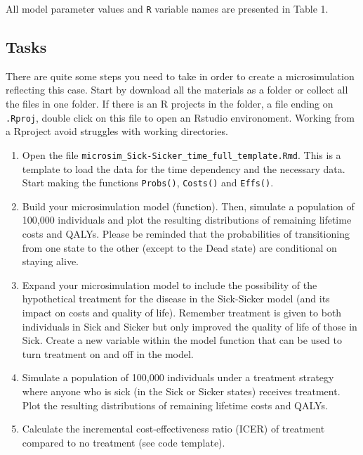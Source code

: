 \documentclass[
]{article}
\begin{document}
All model parameter values and \texttt{R} variable names are presented
in Table 1.

\hypertarget{tasks}{%
\subsection{Tasks}\label{tasks}}

There are quite some steps you need to take in order to create a
microsimulation reflecting this case. Start by download all the
materials as a folder or collect all the files in one folder. If there
is an R projects in the folder, a file ending on \texttt{.Rproj}, double
click on this file to open an Rstudio environoment. Working from a
Rproject avoid struggles with working directories.

\begin{enumerate}
\def\labelenumi{\arabic{enumi}.}
\item
  Open the file
  \texttt{microsim\_Sick-Sicker\_time\_full\_template.Rmd}. This is a
  template to load the data for the time dependency and the necessary
  data. Start making the functions \texttt{Probs()}, \texttt{Costs()}
  and \texttt{Effs()}.
\item
  Build your microsimulation model (function). Then, simulate a
  population of 100,000 individuals and plot the resulting distributions
  of remaining lifetime costs and QALYs. Please be reminded that the
  probabilities of transitioning from one state to the other (except to
  the Dead state) are conditional on staying alive.
\item
  Expand your microsimulation model to include the possibility of the
  hypothetical treatment for the disease in the Sick-Sicker model (and
  its impact on costs and quality of life). Remember treatment is given
  to both individuals in Sick and Sicker but only improved the quality
  of life of those in Sick. Create a new variable within the model
  function that can be used to turn treatment on and off in the model.
\item
  Simulate a population of 100,000 individuals under a treatment
  strategy where anyone who is sick (in the Sick or Sicker states)
  receives treatment. Plot the resulting distributions of remaining
  lifetime costs and QALYs.
\item
  Calculate the incremental cost-effectiveness ratio (ICER) of treatment
  compared to no treatment (see code template).
\end{enumerate}

\newpage
\end{document}
